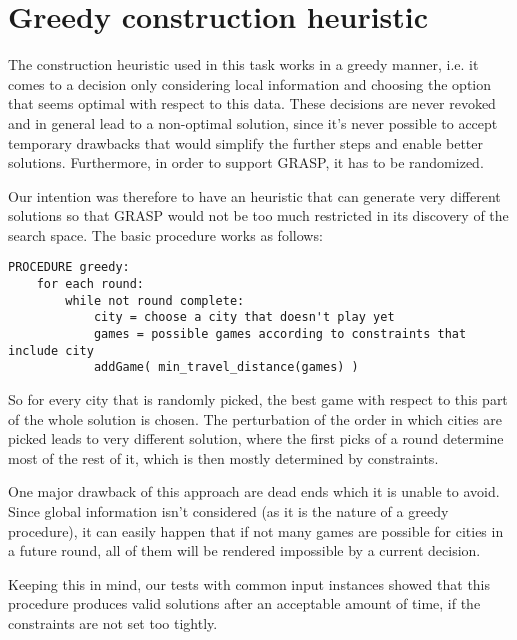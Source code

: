 \section{Greedy construction heuristic}

The construction heuristic used in this task works in a greedy manner, i.e. it comes to a decision only considering local information and choosing the option that seems optimal with respect to this data. These decisions are never revoked and in general lead to a non-optimal solution, since it's never possible to accept temporary drawbacks that would simplify the further steps and enable better solutions. Furthermore, in order to support GRASP, it has to be randomized.

Our intention was therefore to have an heuristic that can generate very different solutions so that GRASP would not be too much restricted in its discovery of the search space. The basic procedure works as follows:

\begin{lstlisting}
PROCEDURE greedy:
	for each round:
		while not round complete:
			city = choose a city that doesn't play yet
			games = possible games according to constraints that include city
			addGame( min_travel_distance(games) )
\end{lstlisting}

So for every city that is randomly picked, the best game with respect to this part of the whole solution is chosen. The perturbation of the order in which cities are picked leads to very different solution, where the first picks of a round determine most of the rest of it, which is then mostly determined by constraints.

One major drawback of this approach are dead ends which it is unable to avoid. Since global information isn't considered (as it is the nature of a greedy procedure), it can easily happen that if not many games are possible for cities in a future round, all of them will be rendered impossible by a current decision.

Keeping this in mind, our tests with common input instances showed that this procedure produces valid solutions after an acceptable amount of time, if the constraints are not set too tightly. 
